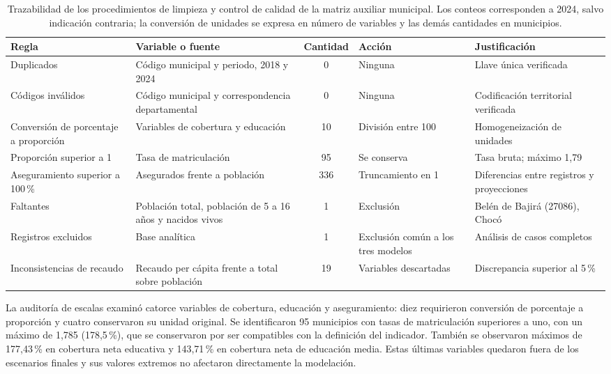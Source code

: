 \begin{table}[!htbp]
\centering
\footnotesize
\caption{Trazabilidad de los procedimientos de limpieza y control de calidad de la matriz auxiliar municipal. Los conteos corresponden a 2024, salvo indicación contraria; la conversión de unidades se expresa en número de variables y las demás cantidades en municipios.}
\label{tab:trazabilidad}
\renewcommand{\arraystretch}{1.2}
\setlength{\tabcolsep}{4pt}
\begin{tabular}{p{2.7cm} p{3.0cm} c p{2.3cm} p{2.7cm}}
\hline
Regla & Variable o fuente & Cantidad & Acción & Justificación \\
\hline
Duplicados & Código municipal y periodo, 2018 y 2024 & 0 & Ninguna & Llave única verificada \\
Códigos inválidos & Código municipal y correspondencia departamental & 0 & Ninguna & Codificación territorial verificada \\
Conversión de porcentaje a proporción & Variables de cobertura y educación & 10 & División entre 100 & Homogeneización de unidades \\
Proporción superior a 1 & Tasa de matriculación & 95 & Se conserva & Tasa bruta; máximo 1,79 \\
Aseguramiento superior a 100\,\% & Asegurados frente a población & 336 & Truncamiento en 1 & Diferencias entre registros y proyecciones \\
Faltantes & Población total, población de 5 a 16 años y nacidos vivos & 1 & Exclusión & Belén de Bajirá (27086), Chocó \\
Registros excluidos & Base analítica & 1 & Exclusión común a los tres modelos & Análisis de casos completos \\
Inconsistencias de recaudo & Recaudo per cápita frente a total sobre población & 19 & Variables descartadas & Discrepancia superior al 5\,\% \\
\hline
\end{tabular}
\end{table}

La auditoría de escalas examinó catorce variables de cobertura, educación y aseguramiento: diez requirieron conversión de porcentaje a proporción y cuatro conservaron su unidad original. Se identificaron 95 municipios con tasas de matriculación superiores a uno, con un máximo de 1,785 (178,5\,\%), que se conservaron por ser compatibles con la definición del indicador. También se observaron máximos de 177,43\,\% en cobertura neta educativa y 143,71\,\% en cobertura neta de educación media. Estas últimas variables quedaron fuera de los escenarios finales y sus valores extremos no afectaron directamente la modelación.

